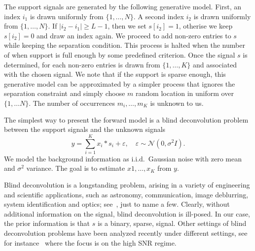 \documentclass[english]{article}
\numberwithin{equation}{section}
\theoremstyle{plain}
\theoremstyle{definition}
\theoremstyle{remark}
\theoremstyle{plain}
\theoremstyle{remark}
\theoremstyle{plain}
\theoremstyle{plain}
\newcommand{\SNR}{\textsf{SNR} }
\begin{document}
The support signals are generated by the following generative model. First, an index $i_1$ is drawn uniformly from $\{1,\ldots,N\}$. A second index $i_2$ is drawn uniformly from $\{1,\ldots,N\}$. If $\vert i_2-i_1\vert \geq L-1$,
then we set $s[i_2]=1$, otherise we keep $s[i_2]=0$ and draw an index again. We proceed to add non-zero entries to $s$ while keeping the separation condition. This process is halted when the number of when support is full enough by some predefined criterion. Once the signal $s$ is determined, for each non-zero entries is drawn from $\{1,\ldots,K\}$ and associated with the chosen signal. We note that if the support is sparse enough, this generative model can be approximated by a simpler process that ignores the separation constraint and simply choose $m$ random location in uniform over $\{1,\ldots N\}$. The number of occurrences $m_i,\ldots,m_K$ is unknown to us. 

The simplest way to present the forward model is a blind deconvolution problem between the support signals and the unknown signals
\begin{equation}
y = \sum_{i=1}^K x_i\ast s_i + \varepsilon,\quad \varepsilon\sim\mathcal{N}(0,\sigma^2 I).
\end{equation}
We model the background information as i.i.d.\ Gaussian noise with zero mean and $\sigma^2$ variance. 
The goal is to estimate $x1,\ldots,x_K$ from $y$.

Blind deconvolution is a longstanding problem, arising in a variety of engineering and scientific applications, such as astronomy, communication, image deblurring, system identification and optics; see~\cite{jefferies1993restoration,shalvi1990new,ayers1988iterative,abed1997blind}, just to name a few. Clearly, without additional information on the signal, blind deconvolution is ill-posed. In our case, the prior information is that $s$ is a binary, sparse, signal. 
Other settings of blind deconvolution problems have been analyzed recently under different settings, see for instance~\cite{ahmed2014blind,li2016identifiability,li2016rapid,ling2015self,ling2017blind,chi2016guaranteed}
where the focus is on the high \SNR regime.
\end{document}
